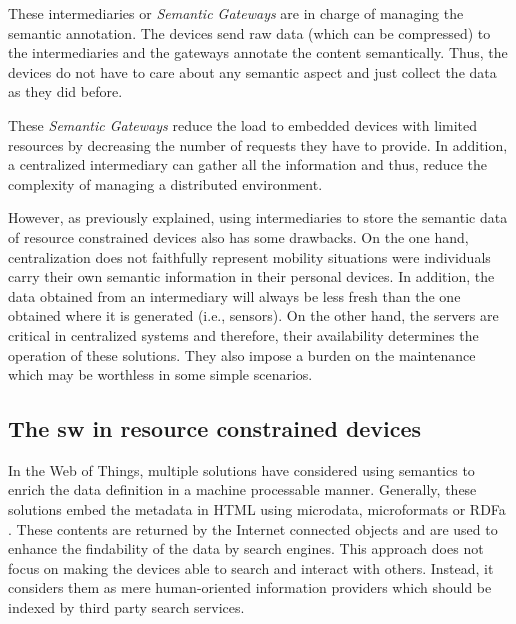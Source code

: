 These intermediaries or \emph{Semantic Gateways} are in charge of managing the semantic annotation.
The devices send raw data (which can be compressed) to the intermediaries and the gateways annotate the content semantically.
Thus, the devices do not have to care about any semantic aspect and just collect the data as they did before.

These \emph{Semantic Gateways} reduce the load to embedded devices with limited resources by decreasing the number of requests they have to provide.
In addition, a centralized intermediary can gather all the information and thus, reduce the complexity of managing a distributed environment.

However, as previously explained, using intermediaries to store the semantic data of resource constrained devices also has some drawbacks.
On the one hand, centralization does not faithfully represent mobility situations were individuals carry their own semantic information in their personal devices.
In addition, the data obtained from an intermediary will always be less fresh than the one obtained where it is generated (i.e., sensors).
On the other hand, the servers are critical in centralized systems and therefore, their availability determines the operation of these solutions.
They also impose a burden on the maintenance which may be worthless in some simple scenarios.


\subsection{The \acl{sw} in resource constrained devices}



In the Web of Things, multiple solutions have considered using semantics to enrich the data definition in a machine processable manner.
Generally, these solutions embed the metadata in HTML using microdata, microformats or RDFa \citep{mayer_extensible_2011}.
These contents are returned by the Internet connected objects and are used to enhance the findability of the data by search engines.
This approach does not focus on making the devices able to search and interact with others.
Instead, it considers them as mere human-oriented information providers which should be indexed by third party search services.

